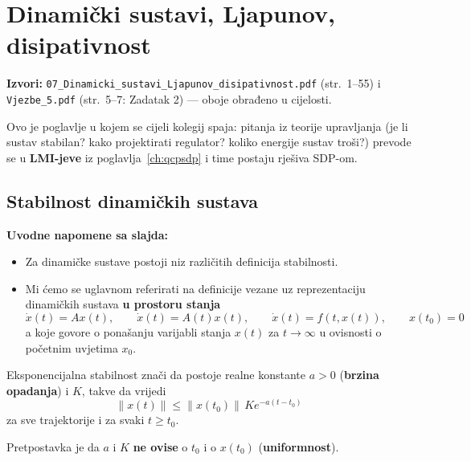 \chapter{Dinamički sustavi, Ljapunov, disipativnost}
\label{ch:dinamicki}

\begin{izvor}
\textbf{Izvori:} \texttt{07\_Dinamicki\_sustavi\_Ljapunov\_disipativnost.pdf}
(str.\ 1--55) i \texttt{Vjezbe\_5.pdf} (str.\ 5--7: Zadatak 2) --- oboje
obrađeno u cijelosti.
\end{izvor}

Ovo je poglavlje u kojem se cijeli kolegij spaja: pitanja iz teorije upravljanja
(je li sustav stabilan? kako projektirati regulator? koliko energije sustav
troši?) prevode se u \textbf{LMI-jeve} iz poglavlja~\ref{ch:qcpsdp} i time
postaju rješiva SDP-om.

\section{Stabilnost dinamičkih sustava}

\textbf{Uvodne napomene sa slajda:}

\begin{itemize}
  \item Za dinamičke sustave postoji niz različitih definicija stabilnosti.
  \item Mi ćemo se uglavnom referirati na definicije vezane uz reprezentaciju
        dinamičkih sustava \textbf{u prostoru stanja}
        \[
        \dot x(t) = Ax(t), \qquad
        \dot x(t) = A(t)x(t), \qquad
        \dot x(t) = f(t, x(t)), \qquad x(t_0) = 0
        \]
        a koje govore o ponašanju varijabli stanja $x(t)$ za $t \to \infty$ u
        ovisnosti o početnim uvjetima $x_0$.
\end{itemize}

\begin{definicija}
Eksponencijalna stabilnost znači da postoje realne konstante $a > 0$
(\textbf{brzina opadanja}) i $K$, takve da vrijedi
\begin{equation}
\label{eq:eksp-stabilnost}
\|x(t)\| \le \|x(t_0)\|\,K e^{-a(t-t_0)}
\end{equation}
za sve trajektorije i za svaki $t \ge t_0$.

Pretpostavka je da $a$ i $K$ \textbf{ne ovise} o $t_0$ i o $x(t_0)$
(\textbf{uniformnost}).
\end{definicija}

